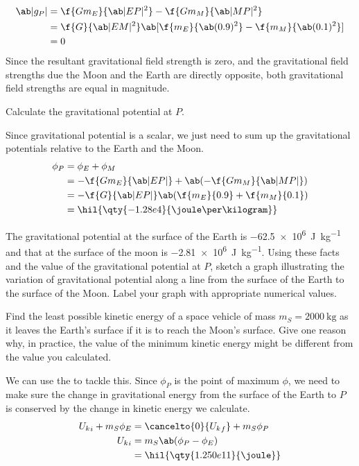 \begin{align*}
	\ab|g_P| & = \f{Gm_E}{\ab|EP|^2} - \f{Gm_M}{\ab|MP|^2}                       \\
	         & = \f{G}{\ab|EM|^2} \ab[\f{m_E}{\ab(0.9)^2} - \f{m_M}{\ab(0.1)^2}] \\
	         & = 0
\end{align*}
Since the resultant gravitational field strength is zero, and the
gravitational field strengths due the Moon and the Earth are directly opposite,
both gravitational field strengths are equal in magnitude.

\begin{problem}
Calculate the gravitational potential at \(P\).
\end{problem}
Since gravitational potential is a scalar, we just need to sum up the gravitational potentials
relative to the Earth and the Moon.
\begin{align*}
	\phi_P & = \phi_E + \phi_M                                 \\
	       & = -\f{Gm_E}{\ab|EP|} + \ab(-\f{Gm_M}{\ab|MP|})    \\
	       & = -\f{G}{\ab|EP|}\ab(\f{m_E}{0.9} + \f{m_M}{0.1}) \\
	       & = \hil{\qty{-1.28e4}{\joule\per\kilogram}}
\end{align*}

\begin{problem}
The gravitational potential at the surface of the Earth is \qty{-62.5e6}{\joule\per\kilogram} and
that at the surface of the moon is \qty{-2.81e6}{\joule\per\kilogram}. Using these facts and the value
of the gravitational potential at \(P\), sketch a graph illustrating the variation of gravitational potential along a line from the surface of the Earth to the surface of the Moon.
Label your graph with appropriate numerical values.
\end{problem}

\begin{problem}
Find the least possible kinetic energy of a space vehicle of mass \(m_S = \qty{2000}{\kilogram}\)
as it leaves the Earth's surface if it is to reach the Moon's surface. Give one reason why, in practice,
the value of the minimum kinetic energy might be different from the value you calculated.
\end{problem}
We can use the  to tackle this.
Since \(\phi_P\) is the point of maximum \(\phi\), we need to make sure the
change in gravitational energy from the surface of the Earth to \(P\) is conserved
by the change in kinetic energy we calculate.
\begin{align*}
	{U_k}_i + m_S\phi_E & = \cancelto{0}{{U_k}_f} + m_S\phi_P \\
	{U_k}_i             & = m_S\ab(\phi_P - \phi_E)           \\
	                    & = \hil{\qty{1.250e11}{\joule}}
\end{align*}

